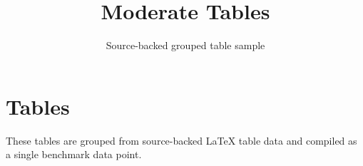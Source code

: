 \documentclass[11pt]{article}
\title{Moderate Tables}
\author{Source-backed grouped table sample}
\date{}
\begin{document}
\maketitle
\section{Tables}
These tables are grouped from source-backed LaTeX table data and compiled as a single benchmark data point.

\begin{table}[htbp]
\centering
\caption{Source table 1: 2512.05458\_table\_1}
\end{table}
\end{document}
